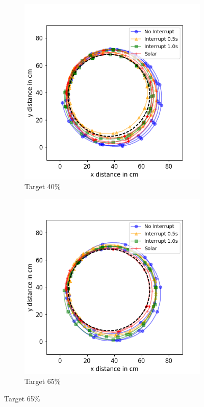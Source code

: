 \begin{figure}[h!]
	\centering
	\begin{subfigure}[b]{0.49\textwidth}
		\includegraphics[width=\textwidth]{pics/circle_40.png}
		\caption{Target 40\%}
		\label{fig:circ_exp1}
	\end{subfigure}
	\begin{subfigure}[b]{0.49\textwidth}
		\includegraphics[width=\textwidth]{pics/circle_65.png}
		\caption{Target 65\%}
		\label{fig:circ_exp2}
	\end{subfigure}


\end{figure}
